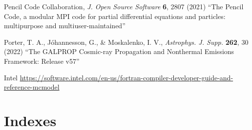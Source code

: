 \documentclass[\mydriver,12pt,twoside,notitlepage,a4paper]{article}
\begin{document}
\begin{thebibliography}{99}
 Pencil Code Collaboration,
\emph{J. Open Source Software} \textbf{6}, 2807 (2021)
``The Pencil Code, a modular MPI code for partial differential
equations and particles: multipurpose and multiuser-maintained''

 Porter, T. A., J\'ohannesson, G., \& Moskalenko, I. V.,
  \emph{Astrophys. J. Supp.} \textbf{262}, 30 (2022)
``The GALPROP Cosmic-ray Propagation and Nonthermal Emissions Framework: Release v57''

 Intel \url{https://software.intel.com/en-us/fortran-compiler-developer-guide-and-reference-mcmodel}

\end{thebibliography}


\cleardoublepage

\part{Indexes}
\printindex[file]
\printindex[var]

\ \vfill\bigskip{}
\end{document}
